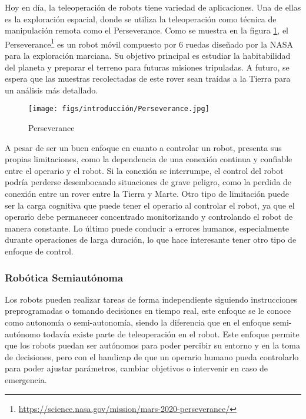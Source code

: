 Hoy en día, la teleoperación de robots tiene variedad de aplicaciones. Una de ellas es la exploración espacial, donde se utiliza la teleoperación
como técnica de manipulación remota como el Perseverance. Como se muestra en la figura \ref{fig:Perseverance}, el Perseverance\footnote{\url{https://science.nasa.gov/mission/mars-2020-perseverance/}} 
es un robot móvil compuesto por 6 ruedas diseñado por la NASA para la exploración marciana. Su objetivo principal es estudiar la habitabilidad del planeta y preparar el terreno para futuras misiones 
tripuladas. A futuro, se espera que las muestras recolectadas de este rover sean traídas a la Tierra para un análisis más detallado.
\begin{figure} [H]
  \begin{center}
    \texttt{[image: figs/introducción/Perseverance.jpg]}
  \end{center}
  \caption{Perseverance}
  \label{fig:Perseverance}
  \vspace{-1.5em}
\end{figure}

A pesar de ser un buen enfoque en cuanto a controlar un robot, presenta sus propias limitaciones, como la dependencia de una conexión continua y confiable entre
el operario y el robot. Si la conexión se interrumpe, el control del robot podría perderse desembocando situaciones de grave peligro, como la perdida de conexión entre un rover entre 
la Tierra y Marte. Otro tipo de limitación puede ser la carga
cognitiva que puede tener el operario al controlar el robot, ya que el operario debe permanecer concentrado monitorizando y controlando el robot de manera constante.
Lo último puede conducir a errores humanos, especialmente durante operaciones de larga duración, lo que hace interesante tener otro tipo de enfoque de control.

\subsubsection{Robótica Semiautónoma}
\label{sec:subseccion}
Los robots pueden realizar tareas de forma independiente siguiendo instrucciones preprogramadas o tomando decisiones en tiempo real, este enfoque se le conoce como autonomía o semi-autonomía, 
siendo la diferencia que en el enfoque semi-autónomo todavía existe parte de teleoperación en el robot. Este enfoque permite que los robots puedan ser autónomos para poder
percibir su entorno y en la toma de decisiones, pero con el handicap de que un operario humano pueda controlarlo para poder ajustar parámetros, cambiar objetivos o intervenir 
en caso de emergencia. 

